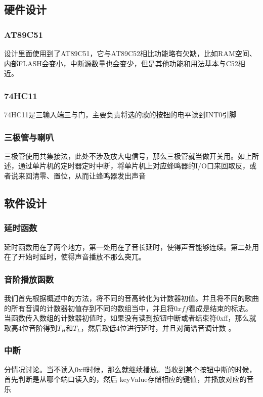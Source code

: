 \documentclass[UTF8]{ctexart}
\begin{document}
    \subsection{硬件设计}
    \subsubsection{AT89C51}
    设计里面使用到了AT89C51，它与AT89C52相比功能略有欠缺，比如RAM空间、内部FLASH会变小，中断源数量也会变少，但是其他功能和用法基本与C52相近。
    \subsubsection{74HC11}
    74HC11是三输入端三与门，主要负责将选的歌的按钮的电平读到$\overline{\mathrm{INT0}}$引脚
    \subsubsection{三极管与喇叭}
    三极管使用共集接法，此处不涉及放大电信号，那么三极管就当做开关用。如上所述，通过单片机的定时器定时中断，将单片机上对应蜂鸣器的I/O口来回取反，或者说来回清零、置位，从而让蜂鸣器发出声音
    \subsection{软件设计}
    \subsubsection{延时函数}
    延时函数用在了两个地方，第一处用在了音长延时，使得声音能够连续。第二处用在了开始时延时，使得声音播放不那么突兀。
    \subsubsection{音阶播放函数}
    我们首先根据概述中的方法，将不同的音高转化为计数器初值。并且将不同的歌曲的所有音调的计数器初值存到不同的数组当中，并且将$0xff$看成是结束的标志。当函数传入数组的计数器初值时，如果没有读到按钮中断或者结束符0xff，那么就取高4位音阶得到$T_{H}$和$T_{L}$，然后取低4位进行延时，并且对简谱音调计数 。
    \subsubsection{中断}
    分情况讨论。当不读入0xff时候，那么就继续播放。当收到某个按钮中断的时候，首先判断是从哪个端口读入的，然后  keyValue存储相应的键值，并播放对应的音乐
\end{document}

